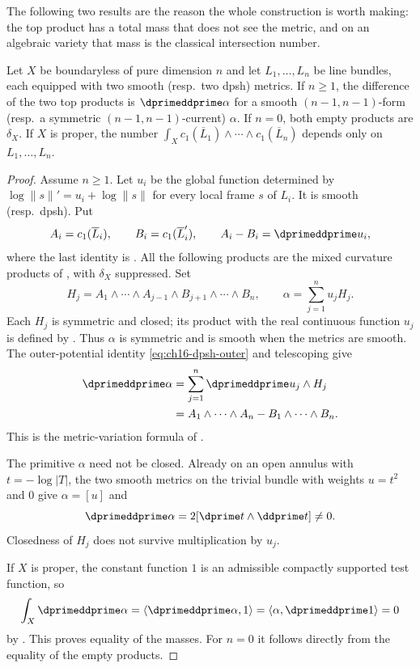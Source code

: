 The following two results are the reason the whole construction is worth
making: the top product has a total mass that does not see the metric, and
on an algebraic variety that mass is the classical intersection number.

\begin{proposition}
\label{prop:ch17-mass-independent}
Let $X$ be boundaryless of pure dimension $n$ and let $L_1,\dots,L_n$
be line bundles, each equipped with two smooth (resp.\ two dpsh)
metrics.  If $n\geq1$, the difference of the two top products is
$\dprimeddprime\alpha$ for a smooth $(n-1,n-1)$-form
(resp.\ a symmetric $(n-1,n-1)$-current) $\alpha$.
If $n=0$, both empty products are $\delta_X$.
If $X$ is proper, the number
$\int_Xc_1(\overline L_1)\wedge\cdots\wedge c_1(\overline L_n)$
depends only on $L_1,\dots,L_n$.
\end{proposition}

\begin{proof}
Assume $n\geq1$.  Let $u_i$ be the global function determined by
$\log\|s\|'=u_i+\log\|s\|$ for every local frame $s$ of $L_i$.
It is smooth (resp.\ dpsh).  Put
\[
 A_i=c_1(\overline L_i),\qquad B_i=c_1(\overline L_i'),
 \qquad A_i-B_i=\dprimeddprime u_i,
\]
where the last identity is .
All the following products are the mixed curvature products of
, with $\delta_X$ suppressed.
Set
\[
 H_j=A_1\wedge\cdots\wedge A_{j-1}
          \wedge B_{j+1}\wedge\cdots\wedge B_n,
 \qquad
 \alpha=\sum_{j=1}^n u_jH_j .
\]
Each $H_j$ is symmetric and closed; its product with the real
continuous function $u_j$ is defined by
.  Thus $\alpha$ is symmetric and is
smooth when the metrics are smooth.  The outer-potential identity
\eqref{eq:ch16-dpsh-outer} and telescoping give
\[
\begin{aligned}
 \dprimeddprime\alpha
   &=\sum_{j=1}^n \dprimeddprime u_j\wedge H_j\\
   &=A_1\wedge\cdots\wedge A_n-B_1\wedge\cdots\wedge B_n .
\end{aligned}
\]
This is the metric-variation formula of
\cite[Proposition~18.3.10]{CLD25}.

The primitive $\alpha$ need not be closed.  Already on an open
annulus with $t=-\log|T|$, the two smooth metrics on the trivial
bundle with weights $u=t^2$ and $0$ give $\alpha=[u]$ and
\[
                  \dprimeddprime\alpha
                        =2[\dprime t\wedge\ddprime t]\ne0 .
\]
Closedness of $H_j$ does not survive multiplication by $u_j$.

If $X$ is proper, the constant function $1$ is an admissible compactly
supported test function, so
\[
 \int_X\dprimeddprime\alpha
      =\langle\dprimeddprime\alpha,1\rangle
      =\langle\alpha,\dprimeddprime1\rangle=0
\]
by .
This proves equality of the masses.  For $n=0$ it follows directly
from the equality of the empty products.
\end{proof}

